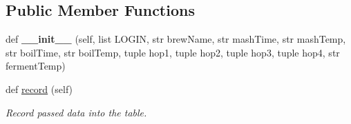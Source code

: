 \subsection*{Public Member Functions}
\begin{DoxyCompactItemize}
\item 
\mbox{\label{classsql_brewing_comms_1_1_s_q_l_new_brew_a90856979eed6f0727eac2628dac15d07}} 
def {\bfseries \+\_\+\+\_\+init\+\_\+\+\_\+} (self, list L\+O\+G\+IN, str brew\+Name, str mash\+Time, str mash\+Temp, str boil\+Time, str boil\+Temp, tuple hop1, tuple hop2, tuple hop3, tuple hop4, str ferment\+Temp)
\item 
\mbox{\label{classsql_brewing_comms_1_1_s_q_l_new_brew_a6f68ab4cdb7b0e2155482f3b957238c9}} 
def \mbox{\hyperlink{classsql_brewing_comms_1_1_s_q_l_new_brew_a6f68ab4cdb7b0e2155482f3b957238c9}{record}} (self)
\begin{DoxyCompactList}\small\item\em Record passed data into the table. \end{DoxyCompactList}\end{DoxyCompactItemize}
